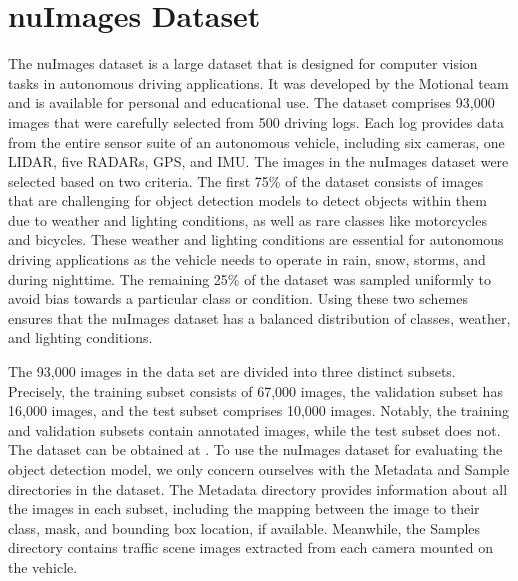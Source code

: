 \section{nuImages Dataset}  \label{sec:nuimage}

The nuImages dataset is a large dataset that is designed for computer vision tasks in autonomous driving applications. It was developed by the Motional team and is available for personal and educational use. The dataset comprises 93,000 images that were carefully selected from 500 driving logs. Each log provides data from the entire sensor suite of an autonomous vehicle, including six cameras, one LIDAR, five RADARs, GPS, and IMU. The images in the nuImages dataset were selected based on two criteria. The first 75\% of the dataset consists of images that are challenging for object detection models to detect objects within them due to weather and lighting conditions, as well as rare classes like motorcycles and bicycles. These weather and lighting conditions are essential for autonomous driving applications as the vehicle needs to operate in rain, snow, storms, and during nighttime. The remaining 25\% of the dataset was sampled uniformly to avoid bias towards a particular class or condition. Using these two schemes ensures that the nuImages dataset has a balanced distribution of classes, weather, and lighting conditions.

The 93,000 images in the data set are divided into three distinct subsets. Precisely, the training subset consists of 67,000 images, the validation subset has 16,000 images, and the test subset comprises 10,000 images. Notably, the training and validation subsets contain annotated images, while the test subset does not. The dataset can be obtained at \cite{nuimages_dataset}. To use the nuImages dataset for evaluating the object detection model, we only concern ourselves with the Metadata and Sample directories in the dataset. The Metadata directory provides information about all the images in each subset, including the mapping between the image to their class, mask, and bounding box location, if available. Meanwhile, the Samples directory contains traffic scene images extracted from each camera mounted on the vehicle. 

